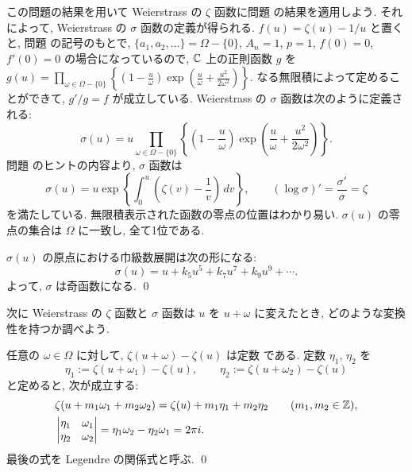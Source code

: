 \documentclass[12pt,twoside]{jarticle}
\def\setminus{-}
\def\Z{{\Bbb Z}} %
\def\C{{\Bbb C}} %
\begin{document}
この問題の結果を用いて Weierstrass の $\zeta$ 函数に問題 
 の結果を適用しよう. それによって, Weierstrass の %
$\sigma$ 函数の定義が得られる.
$f(u)=\zeta(u)-1/u$ と置くと, 問題  の記号のもとで, 
$\{a_1,a_2,\ldots\}=\Omega\setminus\{0\}$, $A_n=1$, $p=1$, %
$f(0)=0$, $f'(0)=0$ の場合になっているので, $\C$ 上の正則函数 $g$ を %
\(
  g(u) = 
  \prod_{\omega\in\Omega\setminus\{0\}}
  \left\{
    \left( 1 - \frac{u}{\omega} \right)
    \exp\left( \frac{u}{\omega} + \frac{u^2}{2\omega^2}\right)
  \right\}.
\) %
なる無限積によって定めることができて, $g'/g=f$ が成立している. %
Weierstrass の $\sigma$ 函数は次のように定義される:
\[
  \sigma(u) =
  u
  \prod_{\omega\in\Omega\setminus\{0\}}
  \left\{
    \left( 1 - \frac{u}{\omega} \right)
    \exp\left( \frac{u}{\omega} + \frac{u^2}{2\omega^2}\right)
  \right\}.
\] %
問題  のヒントの内容より, $\sigma$ 函数は
\[
  \sigma(u) = 
  u
  \exp\left\{
    \int_0^u \left(\zeta(v) - \frac{1}{v}\right)\,dv
  \right\},
  \qquad
  (\log\sigma)' = \frac{\sigma'}{\sigma} = \zeta
\] %
を満たしている. 無限積表示された函数の零点の位置はわかり易い. %
$\sigma(u)$ の零点の集合は $\Omega$ に一致し, 全て1位である.

\begin{question}\qstar{*}
  $\sigma(u)$ の原点における巾級数展開は次の形になる:
  \[
    \sigma(u) =
    u + k_5 u^5 + k_7 u^7 + k_9 u^9 + \cdots.
  \]
  よって, $\sigma$ は奇函数になる. \qed
\end{question}

次に Weierstrass の $\zeta$ 函数と $\sigma$ 函数は $u$ を $u+\omega$ %
に変えたとき, どのような変換性を持つか調べよう.

\begin{question}\qstar{*}
  任意の $\omega\in\Omega$ に対して, $\zeta(u+\omega)-\zeta(u)$ は定数
  である. 定数 $\eta_1$, $\eta_2$ を
  \[
    \eta_1 := \zeta(u+\omega_1) - \zeta(u),
    \qquad
    \eta_2 := \zeta(u+\omega_2) - \zeta(u)
  \]
  と定めると, 次が成立する:
  \begin{align*}
    &
    \zeta(u+m_1\omega_1+m_2\omega_2) = 
    \zeta(u) + m_1\eta_1 + m_2\eta_2
    \qquad
    (m_1,m_2\in\Z),
    \\ &
    \begin{vmatrix}
      \eta_1 & \omega_1 \\
      \eta_2 & \omega_2
    \end{vmatrix}
    = \eta_1 \omega_2 - \eta_2 \omega_1
    = 2\pi i.
  \end{align*}
  最後の式を Legendre の関係式と呼ぶ. \qed
\end{question}
\end{document}
